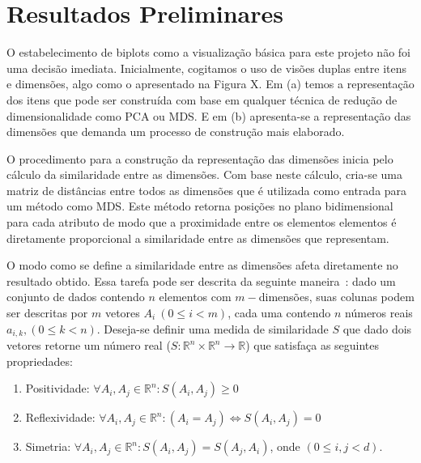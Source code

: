 \section{Resultados Preliminares}

O estabelecimento de biplots como a visualização básica para
este projeto não foi uma decisão imediata. Inicialmente,
cogitamos o uso de visões duplas entre itens e dimensões,
algo como o apresentado na Figura X. Em (a) temos a
representação dos itens que pode ser construída com base em
qualquer técnica de redução de dimensionalidade como PCA ou
MDS. E em (b) apresenta-se a representação das dimensões que
demanda um processo de construção mais elaborado.

O procedimento para a construção da representação das
dimensões inicia pelo cálculo da similaridade entre as
dimensões. Com base neste cálculo, cria-se uma matriz de
distâncias entre todos as dimensões que é utilizada como
entrada para um método como MDS. Este método retorna 
posições no plano bidimensional para cada atributo de modo
que a proximidade entre os elementos elementos é diretamente
proporcional a similaridade entre as dimensões que
representam. 

O modo como se define a similaridade entre as dimensões
afeta diretamente no resultado obtido. Essa tarefa pode ser
descrita da seguinte maneira~\cite{Ankerst1998}: dado um
conjunto de dados contendo $n$ elementos com $m-$dimensões,
suas colunas podem ser descritas por $m$ vetores $A_i~(0
\leq i < m)$, cada uma contendo $n$ números reais $a_{i,k},
(0 \leq k < n)$.  Deseja-se definir uma medida de
similaridade $S$ que dado dois vetores retorne um número
real ($S : \mathbb{R}^n \times \mathbb{R}^n \rightarrow
\mathbb{R}$) que satisfaça as seguintes propriedades:

\begin{enumerate}

    \item Positividade: $\forall A_i,A_j \in \mathbb{R}^n:
        S(A_i,A_j) \geq 0 $

    \item Reflexividade: $\forall A_i,A_j \in
        \mathbb{R}^n: (A_i = A_j) \Leftrightarrow
        S(A_i,A_j) = 0 $

    \item Simetria: $\forall A_i,A_j \in
        \mathbb{R}^n: S(A_i,A_j) =
        S(A_j,A_i)$, onde $(0 \leq i,j <
        d)$.

\end{enumerate}

